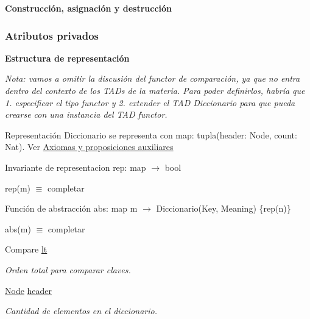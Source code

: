 \begin{Indent}{\bf \-Construcción, asignación y destrucción}
\subsubsection*{\-Atributos privados}
\begin{Indent}{\bf \-Estructura de representación}\par
{\em \-Nota\-: vamos a omitir la discusión del functor de comparación, ya que no entra dentro del contexto de los \-T\-A\-Ds de la materia. \-Para poder definirlos, habría que 1. especificar el tipo functor y 2. extender el \-T\-A\-D \-Diccionario para que pueda crearse con una instancia del \-T\-A\-D functor.

\begin{DoxyParagraph}{\-Representación}
\-Diccionario se representa con map\-: tupla(header\-: Node, count\-: Nat). \-Ver \hyperlink{axiomas}{\-Axiomas y proposiciones auxiliares}
\end{DoxyParagraph}
\begin{DoxyParagraph}{\-Invariante de representacion}
rep\-: map $\to$ bool\par
 rep(m) $\equiv$ completar 
\end{DoxyParagraph}
\begin{DoxyParagraph}{\-Función de abstracción}
abs\-: map m $\to$ \-Diccionario(\-Key, \-Meaning) \{rep(n)\}\par
 abs(m) $\equiv$ completar  
\end{DoxyParagraph}
}\begin{DoxyCompactItemize}
\item 
\-Compare \hyperlink{classaed2_1_1iterator_a3f219bfe5e047bbec03e3339770ae414_a3f219bfe5e047bbec03e3339770ae414}{lt}
\begin{DoxyCompactList}\small\item\em \-Orden total para comparar claves. \end{DoxyCompactList}\item 
\hyperlink{structaed2_1_1iterator_1_1Node}{\-Node} \hyperlink{classaed2_1_1iterator_a19db18e2e77583eb1fa819e854ff9c71_a19db18e2e77583eb1fa819e854ff9c71}{header}
\begin{DoxyCompactList}\small\item\em \-Cantidad de elementos en el diccionario. \end{DoxyCompactList}\end{DoxyCompactItemize}
\end{Indent}



\end{Indent}
